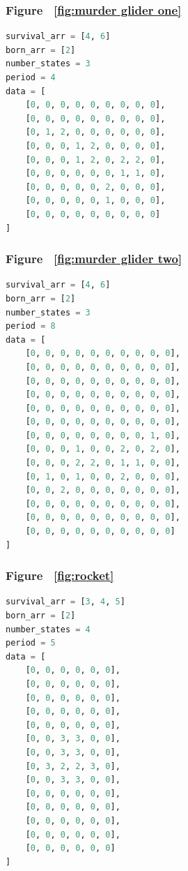 \documentclass[12pt]{article}
\numberwithin{figure}{section} %
\begin{document}
\subsubsection{Figure ~\ref{fig:murder glider one}}
\label{subsubsection:murder glider one}
\begin{lstlisting}[language = Python]
survival_arr = [4, 6]
born_arr = [2]
number_states = 3
period = 4
data = [
    [0, 0, 0, 0, 0, 0, 0, 0, 0],
    [0, 0, 0, 0, 0, 0, 0, 0, 0],
    [0, 1, 2, 0, 0, 0, 0, 0, 0],
    [0, 0, 0, 1, 2, 0, 0, 0, 0],
    [0, 0, 0, 1, 2, 0, 2, 2, 0],
    [0, 0, 0, 0, 0, 0, 1, 1, 0],
    [0, 0, 0, 0, 0, 2, 0, 0, 0],
    [0, 0, 0, 0, 0, 1, 0, 0, 0],
    [0, 0, 0, 0, 0, 0, 0, 0, 0]
]

\end{lstlisting}

\subsubsection{Figure ~\ref{fig:murder glider two}}
\label{subsubsection:murder glider two}
\begin{lstlisting}[language = Python]
survival_arr = [4, 6]
born_arr = [2]
number_states = 3
period = 8
data = [
    [0, 0, 0, 0, 0, 0, 0, 0, 0, 0],
    [0, 0, 0, 0, 0, 0, 0, 0, 0, 0],
    [0, 0, 0, 0, 0, 0, 0, 0, 0, 0],
    [0, 0, 0, 0, 0, 0, 0, 0, 0, 0],
    [0, 0, 0, 0, 0, 0, 0, 0, 0, 0],
    [0, 0, 0, 0, 0, 0, 0, 0, 0, 0],
    [0, 0, 0, 0, 0, 0, 0, 0, 1, 0],
    [0, 0, 0, 1, 0, 0, 2, 0, 2, 0],
    [0, 0, 0, 2, 2, 0, 1, 1, 0, 0],
    [0, 1, 0, 1, 0, 0, 2, 0, 0, 0],
    [0, 0, 2, 0, 0, 0, 0, 0, 0, 0],
    [0, 0, 0, 0, 0, 0, 0, 0, 0, 0],
    [0, 0, 0, 0, 0, 0, 0, 0, 0, 0],
    [0, 0, 0, 0, 0, 0, 0, 0, 0, 0]
]
\end{lstlisting}

\subsubsection{Figure ~\ref{fig:rocket}}
\label{subsubsection:rocket}
\begin{lstlisting}[language = Python]
survival_arr = [3, 4, 5]
born_arr = [2]
number_states = 4
period = 5
data = [
    [0, 0, 0, 0, 0, 0],
    [0, 0, 0, 0, 0, 0],
    [0, 0, 0, 0, 0, 0],
    [0, 0, 0, 0, 0, 0],
    [0, 0, 0, 0, 0, 0],
    [0, 0, 3, 3, 0, 0],
    [0, 0, 3, 3, 0, 0],
    [0, 3, 2, 2, 3, 0], 
    [0, 0, 3, 3, 0, 0],
    [0, 0, 0, 0, 0, 0],
    [0, 0, 0, 0, 0, 0],
    [0, 0, 0, 0, 0, 0],
    [0, 0, 0, 0, 0, 0],
    [0, 0, 0, 0, 0, 0]
]
\end{lstlisting}
\end{document}
